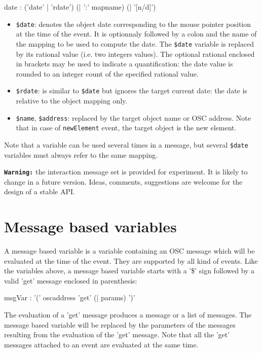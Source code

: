 \documentclass[a4paper,twoside]{report}
\newcommand{\sublevel}[1]	{\section{#1}}
\newcommand{\OSC}[1]		{\texttt{#1}}
\begin{document}
\begin{rail} 
date : ('date' | 'rdate') (| ':'  mapname) (| '[n/d]')

\end{rail}

\begin{itemize}
\item \OSC{\$date}: denotes the object date corresponding to the mouse pointer position at the time of the event. It is optionnaly followed by a colon and the name of the mapping to be used to compute the date. The \OSC{\$date} variable is replaced by its rational value (i.e. two integers values). The optional rational enclosed in brackets may be used to indicate a quantification: the date value is rounded to an integer count of the specified rational value. 
\item \OSC{\$rdate}: is similar to \OSC{\$date} but ignores the target current date: the date is relative to the object mapping only.
\item \OSC{\$name}, \OSC{\$address}: replaced by the target object name or OSC address. Note that in case of \OSC{newElement} event, the target object is the new element. 
\end{itemize}

Note that a variable can be used several times in a message, but several \OSC{\$date} variables must always refer to the same mapping.

\vspace{5mm}
\texttt{\textbf{Warning:}} the interaction message set is provided for experiment. It is likely to change in a future version. Ideas, comments, suggestions are welcome for the design of a stable API.

\sublevel{Message based variables}
\label{msgvar}

A message based variable is a variable containing an OSC message which will be evaluated at the time of the event. They are supported by all kind of events. Like  the variables above, a message based variable starts with a '\$' sign followed by a valid 'get' message enclosed in parenthesis:
\begin{rail} 
msgVar : '(' oscaddress 'get' (| params) ')'
\end{rail}

The evaluation of a 'get' message produces a message or a list of messages. The message based variable will be replaced by the parameters of the messages resulting from the evaluation of the 'get' message.
Note that all the 'get' messages attached to an event are evaluated at the same time.
\end{document}

